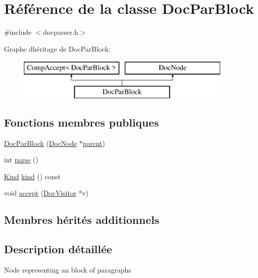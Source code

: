\hypertarget{class_doc_par_block}{}\section{Référence de la classe Doc\+Par\+Block}
\label{class_doc_par_block}


{\ttfamily \#include $<$docparser.\+h$>$}

Graphe d\textquotesingle{}héritage de Doc\+Par\+Block\+:\begin{figure}[H]
\begin{center}
\leavevmode
\includegraphics[height=2.000000cm]{class_doc_par_block}
\end{center}
\end{figure}
\subsection*{Fonctions membres publiques}
\begin{DoxyCompactItemize}
\item 
\hyperlink{class_doc_par_block_a09847c0adedc0ee390523c471b143889}{Doc\+Par\+Block} (\hyperlink{class_doc_node}{Doc\+Node} $\ast$\hyperlink{class_doc_node_a990d8b983962776a647e6231d38bd329}{parent})
\item 
int \hyperlink{class_doc_par_block_a87bac59d6c786e1758c73c04d7b7d3cb}{parse} ()
\item 
\hyperlink{class_doc_node_aebd16e89ca590d84cbd40543ea5faadb}{Kind} \hyperlink{class_doc_par_block_a72632d08552cce9b69ed0fcd57f6ea7a}{kind} () const 
\item 
void \hyperlink{class_doc_par_block_a29de0c7684503d2b885c363250608498}{accept} (\hyperlink{class_doc_visitor}{Doc\+Visitor} $\ast$v)
\end{DoxyCompactItemize}
\subsection*{Membres hérités additionnels}


\subsection{Description détaillée}
Node representing an block of paragraphs 

